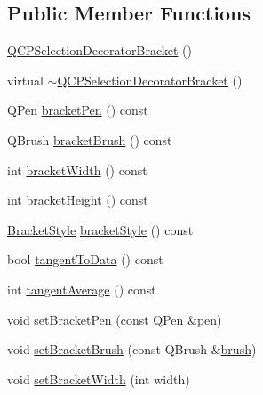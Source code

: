 \subsection*{Public Member Functions}
\begin{DoxyCompactItemize}
\item 
\hyperlink{class_q_c_p_selection_decorator_bracket_ad2cfbff98cc055311810ba357f6eef1b}{Q\+C\+P\+Selection\+Decorator\+Bracket} ()
\item 
virtual \hyperlink{class_q_c_p_selection_decorator_bracket_add2764b01a029c64f08f34f08ea6d41b}{$\sim$\+Q\+C\+P\+Selection\+Decorator\+Bracket} ()
\item 
Q\+Pen \hyperlink{class_q_c_p_selection_decorator_bracket_a841c56a37380f2e8af6126881b5f0fb9}{bracket\+Pen} () const
\item 
Q\+Brush \hyperlink{class_q_c_p_selection_decorator_bracket_ac5e409d6b62f0b71143fb8a526fe59a9}{bracket\+Brush} () const
\item 
int \hyperlink{class_q_c_p_selection_decorator_bracket_ae268c621b808d8660d38fc6c69fc40ae}{bracket\+Width} () const
\item 
int \hyperlink{class_q_c_p_selection_decorator_bracket_a531d9c953a7279db93611248e115edab}{bracket\+Height} () const
\item 
\hyperlink{class_q_c_p_selection_decorator_bracket_aa6d18517ec0553575bbef0de4252336e}{Bracket\+Style} \hyperlink{class_q_c_p_selection_decorator_bracket_a1c3d65e560555caf9b31123008491ac6}{bracket\+Style} () const
\item 
bool \hyperlink{class_q_c_p_selection_decorator_bracket_a257cb5f8b822edc839c1510ed0f23f13}{tangent\+To\+Data} () const
\item 
int \hyperlink{class_q_c_p_selection_decorator_bracket_a4e21ee2db0f43c1208d2e30879ec6a3c}{tangent\+Average} () const
\item 
void \hyperlink{class_q_c_p_selection_decorator_bracket_ac0e392a6097990f8aa978932a8fa05d6}{set\+Bracket\+Pen} (const Q\+Pen \&\hyperlink{class_q_c_p_selection_decorator_a9307a60c9759223367909aed2d05ad91}{pen})
\item 
void \hyperlink{class_q_c_p_selection_decorator_bracket_a2f4ea0bfb0ea980252b76dd349dd53aa}{set\+Bracket\+Brush} (const Q\+Brush \&\hyperlink{class_q_c_p_selection_decorator_a783b643aa52120a25308fc501b9998b1}{brush})
\item 
void \hyperlink{class_q_c_p_selection_decorator_bracket_a291b59cab98ce93a0a3c85963fe10f5e}{set\+Bracket\+Width} (int width)
\item 

\end{DoxyCompactItemize}
